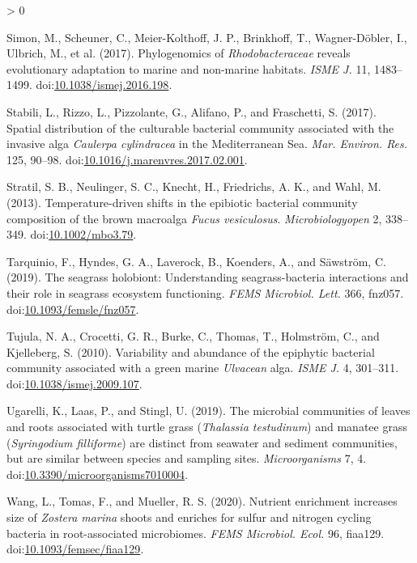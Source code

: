 \documentclass[
  12pt,
]{article}
\newlength{\cslhangindent}
\newenvironment{CSLReferences}[2] %
 {%
  \setlength{\parindent}{0pt}
  \ifodd #1 \everypar{\setlength{\hangindent}{\cslhangindent}}\ignorespaces\fi
  \ifnum #2 > 0
  \setlength{\parskip}{#2\baselineskip}
  \fi
 }%
 {}
\begin{document}
\begin{CSLReferences}{1}{0}
\leavevmode\hypertarget{ref-Simon2017}{}%
Simon, M., Scheuner, C., Meier-Kolthoff, J. P., Brinkhoff, T.,
Wagner-Döbler, I., Ulbrich, M., et al. (2017). Phylogenomics of
{\emph{Rhodobacteraceae}} reveals evolutionary adaptation to marine and
non-marine habitats. \emph{ISME J.} 11, 1483--1499.
doi:\href{https://doi.org/10.1038/ismej.2016.198}{10.1038/ismej.2016.198}.

\leavevmode\hypertarget{ref-Stabili2017}{}%
Stabili, L., Rizzo, L., Pizzolante, G., Alifano, P., and Fraschetti, S.
(2017). Spatial distribution of the culturable bacterial community
associated with the invasive alga {\emph{Caulerpa cylindracea}} in the
{Mediterranean Sea}. \emph{Mar. Environ. Res.} 125, 90--98.
doi:\href{https://doi.org/10.1016/j.marenvres.2017.02.001}{10.1016/j.marenvres.2017.02.001}.

\leavevmode\hypertarget{ref-Stratil2013}{}%
Stratil, S. B., Neulinger, S. C., Knecht, H., Friedrichs, A. K., and
Wahl, M. (2013). Temperature-driven shifts in the epibiotic bacterial
community composition of the brown macroalga {\emph{Fucus vesiculosus}}.
\emph{Microbiologyopen} 2, 338--349.
doi:\href{https://doi.org/10.1002/mbo3.79}{10.1002/mbo3.79}.

\leavevmode\hypertarget{ref-Tarquinio2019}{}%
Tarquinio, F., Hyndes, G. A., Laverock, B., Koenders, A., and Säwström,
C. (2019). The seagrass holobiont: Understanding seagrass-bacteria
interactions and their role in seagrass ecosystem functioning.
\emph{FEMS Microbiol. Lett.} 366, fnz057.
doi:\href{https://doi.org/10.1093/femsle/fnz057}{10.1093/femsle/fnz057}.

\leavevmode\hypertarget{ref-Tujula2010}{}%
Tujula, N. A., Crocetti, G. R., Burke, C., Thomas, T., Holmström, C.,
and Kjelleberg, S. (2010). Variability and abundance of the epiphytic
bacterial community associated with a green marine {\emph{Ulvacean}}
alga. \emph{ISME J.} 4, 301--311.
doi:\href{https://doi.org/10.1038/ismej.2009.107}{10.1038/ismej.2009.107}.

\leavevmode\hypertarget{ref-Ugarelli2019}{}%
Ugarelli, K., Laas, P., and Stingl, U. (2019). The microbial communities
of leaves and roots associated with turtle grass ({\emph{Thalassia
testudinum}}) and manatee grass ({\emph{Syringodium filliforme}}) are
distinct from seawater and sediment communities, but are similar between
species and sampling sites. \emph{Microorganisms} 7, 4.
doi:\href{https://doi.org/10.3390/microorganisms7010004}{10.3390/microorganisms7010004}.

\leavevmode\hypertarget{ref-Wang2020}{}%
Wang, L., Tomas, F., and Mueller, R. S. (2020). Nutrient enrichment
increases size of {\emph{Zostera marina}} shoots and enriches for sulfur
and nitrogen cycling bacteria in root-associated microbiomes. \emph{FEMS
Microbiol. Ecol.} 96, fiaa129.
doi:\href{https://doi.org/10.1093/femsec/fiaa129}{10.1093/femsec/fiaa129}.


\end{CSLReferences}
\end{document}
